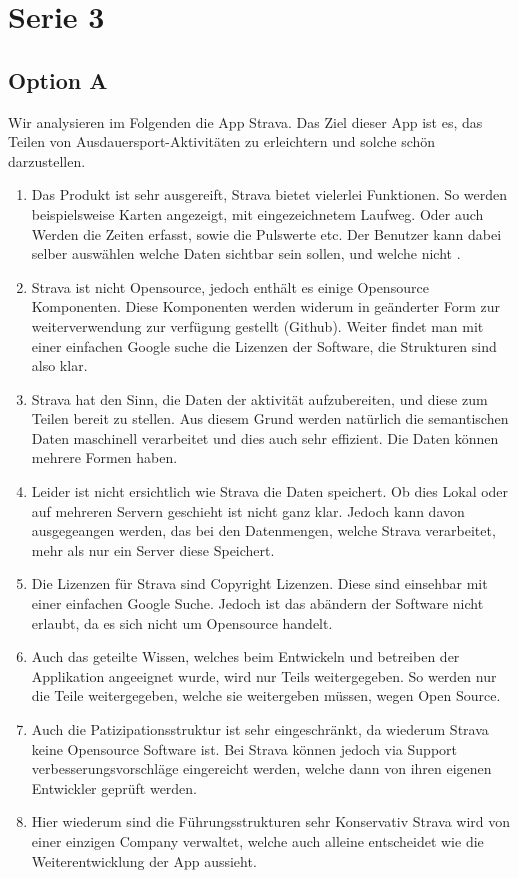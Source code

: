 \documentclass[10pt]{article}
\newcommand{\heading}[2]{\setcounter{section}{#2}\section*{#1 #2}}
\newcommand{\problem}[1]{\subsection{#1}}
\begin{document}
    \heading{Serie}{3}
    \problem{Option A}
    Wir analysieren im Folgenden die App Strava. Das Ziel dieser App ist es, das Teilen von Ausdauersport-Aktivitäten zu erleichtern und solche schön darzustellen. 
    
    \begin{enumerate}
    	\item Das Produkt ist sehr ausgereift, Strava bietet vielerlei Funktionen. So werden beispielsweise Karten angezeigt, mit eingezeichnetem Laufweg. Oder auch Werden die Zeiten erfasst, sowie die Pulswerte etc. Der Benutzer kann dabei selber auswählen welche Daten sichtbar sein sollen, und welche nicht .
    	\item Strava ist nicht Opensource, jedoch enthält es einige Opensource Komponenten. Diese Komponenten werden widerum in geänderter Form zur weiterverwendung zur verfügung gestellt (Github). Weiter findet man mit einer einfachen Google suche die Lizenzen der Software, die Strukturen sind also klar. 
    	\item Strava hat den Sinn, die Daten der aktivität aufzubereiten, und diese zum Teilen bereit zu stellen. Aus diesem Grund werden natürlich die semantischen Daten maschinell verarbeitet und dies auch sehr effizient. Die Daten können mehrere Formen haben. 
    	\item Leider ist nicht ersichtlich wie Strava die Daten speichert. Ob dies Lokal oder auf mehreren Servern geschieht ist nicht ganz klar. Jedoch kann davon ausgegeangen werden, das bei den Datenmengen, welche Strava verarbeitet, mehr als nur ein Server diese Speichert. 
    	\item Die Lizenzen für Strava sind Copyright Lizenzen. Diese sind einsehbar mit einer einfachen Google Suche. Jedoch ist das abändern der Software nicht erlaubt, da es sich nicht um Opensource handelt.
    	\item Auch das geteilte Wissen, welches beim Entwickeln und betreiben der Applikation angeeignet wurde, wird nur Teils weitergegeben. So werden nur die Teile weitergegeben, welche sie weitergeben müssen, wegen Open Source.
    	\item Auch die Patizipationsstruktur ist sehr eingeschränkt, da wiederum Strava keine Opensource Software ist. Bei Strava können jedoch via Support verbesserungsvorschläge eingereicht werden, welche dann von ihren eigenen Entwickler geprüft werden.
    	\item Hier wiederum sind die Führungsstrukturen sehr Konservativ Strava wird von einer einzigen Company verwaltet, welche auch alleine entscheidet wie die Weiterentwicklung der App aussieht.

\end{enumerate}
\end{document}

